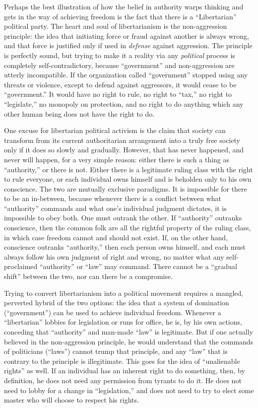 \documentclass{book}
\begin{document}
Perhaps the best illustration of how the belief in authority warps thinking and gets in the way of achieving freedom is the fact that there is a \enquote{Libertarian} political party. The heart and soul of libertarianism is the non-aggression principle: the idea that initiating force or fraud against another is always wrong, and that force is justified only if used in \emph{defense} against aggression. The principle is perfectly sound, but trying to make it a reality via any \emph{political} process is completely self-contradictory, because \enquote{government} and non-aggression are utterly incompatible. If the organization called \enquote{government} stopped using any threats or violence, except to defend against aggressors, it would cease to be \enquote{government.} It would have no right to rule, no right to \enquote{tax,} no right to \enquote{legislate,} no monopoly on protection, and no right to do anything which any other human being does not have the right to do.

One excuse for libertarian political activism is the claim that society can transform from its current authoritarian arrangement into a truly free society only if it does so slowly and gradually. However, that has never happened, and never will happen, for a very simple reason: either there is such a thing as \enquote{authority,} or there is not. Either there is a legitimate ruling class with the right to rule everyone, or each individual owns himself and is beholden only to his own conscience. The two are mutually exclusive paradigms. It is impossible for there to be an in-between, because whenever there is a conflict between what \enquote{authority} commands and what one's individual judgment dictates, it is impossible to obey both. One must outrank the other. If \enquote{authority} outranks conscience, then the common folk are all the rightful property of the ruling class, in which case freedom cannot and should not exist. If, on the other hand, conscience outranks \enquote{authority,} then each person owns himself, and each must always follow his own judgment of right and wrong, no matter what any self-proclaimed \enquote{authority} or \enquote{law} may command. There cannot be a \enquote{gradual shift} between the two, nor can there be a compromise.

Trying to convert libertarianism into a political movement requires a mangled, perverted hybrid of the two options: the idea that a system of domination (\enquote{government}) can be used to achieve individual freedom. Whenever a \enquote{libertarian} lobbies for legislation or runs for office, he is, by his own actions, conceding that \enquote{authority} and man-made \enquote{law} is legitimate. But if one actually believed in the non-aggression principle, he would understand that the commands of politicians (\enquote{laws}) cannot trump that principle, and any \enquote{law} that is contrary to the principle is illegitimate. This goes for the idea of \enquote{unalienable rights} as well. If an individual has an inherent right to do something, then, by definition, he does not need any permission from tyrants to do it. He does not need to lobby for a change in \enquote{legislation,} and does not need to try to elect some master who will choose to respect his rights.
\end{document}
